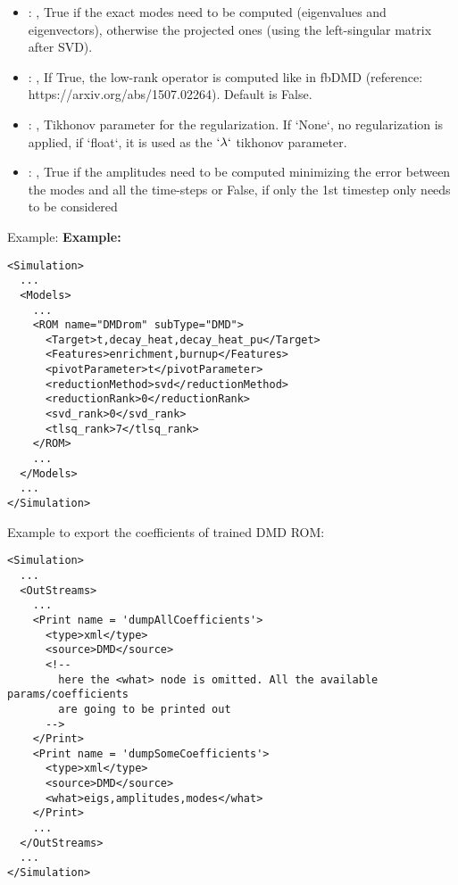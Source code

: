 \begin{itemize}
    \item {}: ,
      True if the exact modes need to be computed (eigenvalues and
      eigenvectors),   otherwise the projected ones (using the left-singular matrix after SVD).

    \item {}: ,
      If True, the low-rank operator is computed like in fbDMD (reference:
      https://arxiv.org/abs/1507.02264).                                                  Default is
      False.

    \item {}: ,
      Tikhonov parameter for the regularization.                                                  If
      `None`, no regularization is applied, if `float`, it is used as the
      $`\lambda`$ tikhonov parameter.

    \item {}: ,
      True if the amplitudes need to be computed minimizing the error
      between the modes and all the time-steps or False, if only the 1st timestep only needs to be
      considered
  \end{itemize}

\hspace{24pt}
Example:
\textbf{Example:}
\begin{lstlisting}[style=XML,morekeywords={name,subType}]
<Simulation>
  ...
  <Models>
    ...
    <ROM name="DMDrom" subType="DMD">
      <Target>t,decay_heat,decay_heat_pu</Target>
      <Features>enrichment,burnup</Features>
      <pivotParameter>t</pivotParameter>
      <reductionMethod>svd</reductionMethod>
      <reductionRank>0</reductionRank>
      <svd_rank>0</svd_rank>
      <tlsq_rank>7</tlsq_rank>
    </ROM>
    ...
  </Models>
  ...
</Simulation>
\end{lstlisting}

Example to export the coefficients of trained DMD ROM:
\begin{lstlisting}[style=XML,morekeywords={name,subType}]
<Simulation>
  ...
  <OutStreams>
    ...
    <Print name = 'dumpAllCoefficients'>
      <type>xml</type>
      <source>DMD</source>
      <!--
        here the <what> node is omitted. All the available params/coefficients
        are going to be printed out
      -->
    </Print>
    <Print name = 'dumpSomeCoefficients'>
      <type>xml</type>
      <source>DMD</source>
      <what>eigs,amplitudes,modes</what>
    </Print>
    ...
  </OutStreams>
  ...
</Simulation>
\end{lstlisting}


